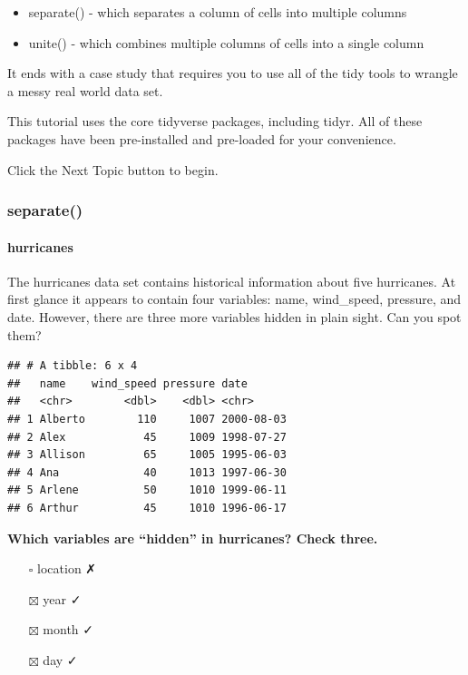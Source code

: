 \documentclass[
]{article}
\providecommand{\tightlist}{%
  \setlength{\itemsep}{0pt}\setlength{\parskip}{0pt}}
\begin{document}
\begin{itemize}
\tightlist
\item
  separate() - which separates a column of cells into multiple columns
\item
  unite() - which combines multiple columns of cells into a single
  column
\end{itemize}

It ends with a case study that requires you to use all of the tidy tools
to wrangle a messy real world data set.

This tutorial uses the core tidyverse packages, including tidyr. All of
these packages have been pre-installed and pre-loaded for your
convenience.

Click the Next Topic button to begin.

\hypertarget{separate}{%
\subsubsection{separate()}\label{separate}}

\hypertarget{hurricanes}{%
\paragraph{hurricanes}\label{hurricanes}}

The hurricanes data set contains historical information about five
hurricanes. At first glance it appears to contain four variables: name,
wind\_speed, pressure, and date. However, there are three more variables
hidden in plain sight. Can you spot them?

\begin{verbatim}
## # A tibble: 6 x 4
##   name    wind_speed pressure date      
##   <chr>        <dbl>    <dbl> <chr>     
## 1 Alberto        110     1007 2000-08-03
## 2 Alex            45     1009 1998-07-27
## 3 Allison         65     1005 1995-06-03
## 4 Ana             40     1013 1997-06-30
## 5 Arlene          50     1010 1999-06-11
## 6 Arthur          45     1010 1996-06-17
\end{verbatim}

\textbf{Which variables are ``hidden'' in hurricanes? Check three.}

\begin{itemize}
\tightlist
\item[$\square$]
  location ✗
\item[$\boxtimes$]
  year ✓
\item[$\boxtimes$]
  month ✓
\item[$\boxtimes$]
  day ✓
\end{itemize}
\end{document}
